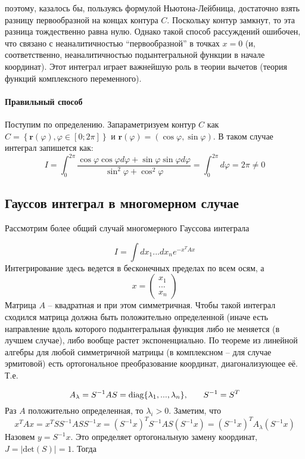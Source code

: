 \documentclass[a4paper,12pt]{article}
\begin{document}
 \noindent
поэтому, казалось бы, пользуясь формулой Ньютона-Лейбница, достаточно
взять разницу первообразной на концах контура $C$. Поскольку контур
замкнут, то эта разница тождественно равна нулю. Однако такой способ
рассуждений ошибочен, что связано с неаналитичностью ``первообразной''
в точках $x=0$ (и, соответственно, неаналитичностью подынтегральной
функции в начале координат). Этот интеграл играет важнейшую роль в
теории вычетов (теория функций комплексного переменного).


\paragraph{Правильный способ}

Поступим по определению. Запараметризуем контур $C$ как $C=\left\{ \mathbf{r}(\varphi),\varphi\in\left[0;2\pi\right]\right\} $
и $\mathbf{r}(\varphi)=(\cos\varphi,\sin\varphi)$. В таком случае
интеграл запишется как:
\[
I=\int_{0}^{2\pi}\frac{\cos\varphi\cos\varphi d\varphi+\sin\varphi\sin\varphi d\varphi}{\sin^{2}\varphi+\cos^{2}\varphi}=\int_{0}^{2\pi}d\varphi=2\pi\neq0
\]

\subsection*{Гауссов интеграл в многомерном случае}
Рассмотрим более общий случай многомерного Гауссова интеграла

\begin{equation}
I=\int dx_{1}...dx_{n}e^{-x^{T}Ax}
\end{equation}
Интегрирование здесь ведется в бесконечных пределах по всем осям, а
\[
x=\left(\begin{array}{c}
x_{1}\\
...\\
x_{n}
\end{array}\right)
\]
Матрица $A$ -- квадратная и при этом симметричная. Чтобы такой интеграл сходился матрица должна быть положительно определенной (иначе есть направление вдоль которого подынтегральная функция либо не меняется (в лучшем случае), либо вообще растет экспоненциально. По теореме из линейной алгебры для любой симметричной матрицы (в комплексном -- для случае эрмитовой) есть ортогональное преобразование координат, диагонализующее её. Т.е.

\begin{equation}
A_\lambda=S^{-1}AS=\mathrm{diag}\{\lambda_{1},...,\lambda_{n}\}\text{,\quad\quad}S^{-1}=S^{T}
\end{equation}
Раз $A$ положительно определенная, то
$\lambda_{i}>0$. Заметим, что
\[
x^{T}Ax=x^{T}SS^{-1}ASS^{-1}x=(S^{-1}x)^{T}S^{-1}AS(S^{-1}x)=(S^{-1}x)^{T}A_\lambda(S^{-1}x)
\]
Назовем $y=S^{-1}x$. Это определяет ортогональную замену координат,
$J=|\mathrm{det}(S)|=1$. Тогда
\end{document}
